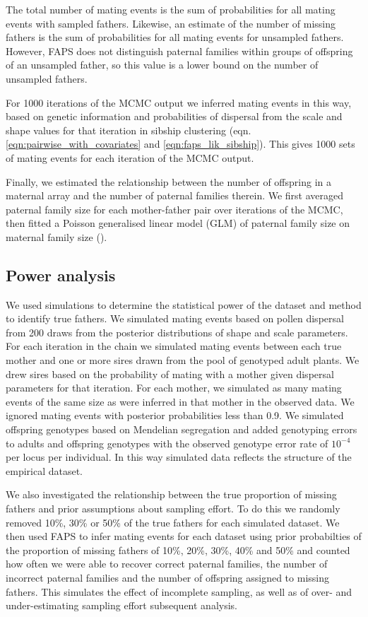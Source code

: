 \documentclass[10pt, a4paper, twocolumn]{article} %
\begin{document}
The total number of mating events is the sum of probabilities for all mating events with sampled fathers.
Likewise, an estimate of the number of missing fathers is the sum of probabilities for all mating events for unsampled fathers.
However, FAPS does not distinguish paternal families within groups of offspring of an unsampled father, so this value is a lower bound on the number of unsampled fathers.

For 1000 iterations of the MCMC output we inferred mating events in this way, based on genetic information and probabilities of dispersal from the scale and shape values for that iteration in sibship clustering (eqn. \ref{eqn:pairwise_with_covariates} and \ref{eqn:faps_lik_sibship}). This gives 1000 sets of mating events for each iteration of the MCMC output.

Finally, we estimated the relationship between the number of offspring in a maternal array and the number of paternal families therein.
We first averaged paternal family size for each mother-father pair over iterations of the MCMC, then fitted a Poisson generalised linear model (GLM) of paternal family size on maternal family size (\cite{McCullagh1989}).

\subsection{Power analysis}

We used simulations to determine the statistical power of the dataset and method to identify true fathers.
We simulated mating events based on pollen dispersal from 200 draws from the posterior distributions of shape and scale parameters.
For each iteration in the chain we simulated mating events between each true mother and one or more sires drawn from the pool of genotyped adult plants.
We drew sires based on the probability of mating with a mother given dispersal parameters for that iteration.
For each mother, we simulated as many mating events of the same size as were inferred in that mother in the observed data.
We ignored mating events with posterior probabilities less than 0.9.
We simulated offspring genotypes based on Mendelian segregation and added genotyping errors to adults and offspring genotypes with the observed genotype error rate of $10^{-4}$ per locus per individual.
In this way simulated data reflects the structure of the empirical dataset.

We also investigated the relationship between the true proportion of missing fathers and prior assumptions about sampling effort.
To do this we randomly removed 10\%, 30\% or 50\% of the true fathers for each simulated dataset.
We then used FAPS to infer mating events for each dataset using prior probabilties of the proportion of missing fathers of 10\%, 20\%, 30\%, 40\% and 50\% and counted how often we were able to recover correct paternal families, the number of incorrect paternal families and the number of offspring assigned to missing fathers.
This simulates the effect of incomplete sampling, as well as of over- and under-estimating sampling effort subsequent analysis.
\end{document}

